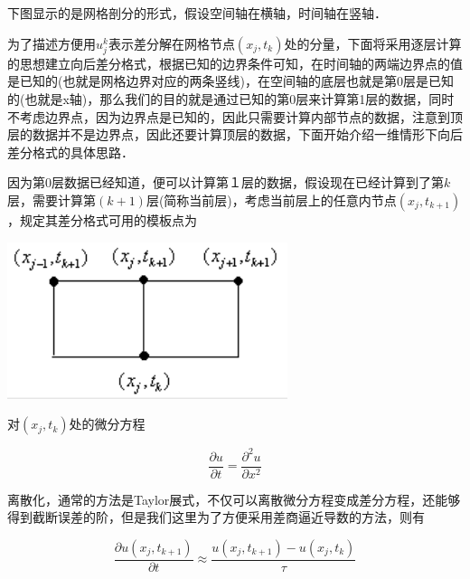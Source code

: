 \documentclass[UTF8]{ctexart}
\begin{document}
下图显示的是网格剖分的形式，假设空间轴在横轴，时间轴在竖轴．

\begin{center}
\end{center}

为了描述方便用$u_j^k$表示差分解在网格节点$(x_j,t_k)$处的分量，下面将采用逐层计算的思想建立向后差分格式，根据已知的边界条件可知，在时间轴的两端边界点的值是已知的(也就是网格边界对应的两条竖线)，在空间轴的底层也就是第0层是已知的(也就是x轴)，那么我们的目的就是通过已知的第0层来计算第1层的数据，同时不考虑边界点，因为边界点是已知的，因此只需要计算内部节点的数据，注意到顶层的数据并不是边界点，因此还要计算顶层的数据，下面开始介绍一维情形下向后差分格式的具体思路．

因为第0层数据已经知道，便可以计算第１层的数据，假设现在已经计算到了第$k$层，需要计算第$(k+1)$层(简称当前层)，考虑当前层上的任意内节点$(x_j,t_{k+1})$，规定其差分格式可用的模板点为

\begin{center}
\includegraphics[scale= 0.6]{1.png}
\end{center}

对$(x_j,t_k)$处的微分方程

\begin{equation}
\dfrac{\partial u}{\partial t}=\dfrac{\partial^2 u}{\partial x^2}
\end{equation}

离散化，通常的方法是Taylor展式，不仅可以离散微分方程变成差分方程，还能够得到截断误差的阶，但是我们这里为了方便采用差商逼近导数的方法，则有

\begin{equation}
\dfrac{\partial u(x_j,t_{k+1})}{\partial t}\approx\dfrac{u(x_j,t_{k+1})-u(x_j,t_k)}{\tau}
\end{equation}
\end{document}
